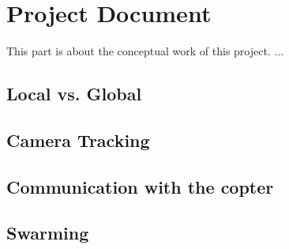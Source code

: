 \chapter{Project Document}\label{ch:ch2label}

This part is about the conceptual work of this project. ...

\section{Local vs. Global}

\section{Camera Tracking}

\section{Communication with the copter}

\section{Swarming}

